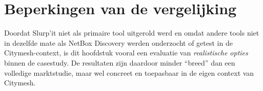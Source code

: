 \section{Beperkingen van de vergelijking}

Doordat Slurp'it niet als primaire tool uitgerold werd en omdat andere tools niet in dezelfde mate als NetBox Discovery werden onderzocht of getest in de Citymesh-context, is dit hoofdstuk vooral een evaluatie van \emph{realistische opties} binnen de casestudy. De resultaten zijn daardoor minder “breed” dan een volledige marktstudie, maar wel concreet en toepasbaar in de eigen context van Citymesh.


